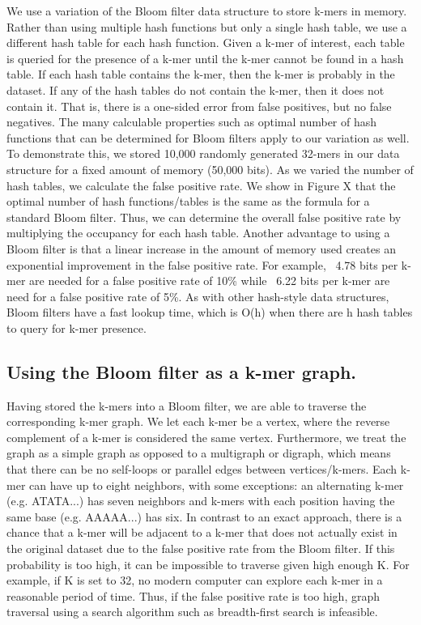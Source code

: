 \documentclass[12pt]{article} \usepackage{simplemargins}
\begin{document}
We use a variation of the Bloom filter data structure to store k-mers
in memory. Rather than using multiple hash functions but only a single
hash table, we use a different hash table for each hash
function. Given a k-mer of interest, each table is queried for the
presence of a k-mer until the k-mer cannot be found in a hash
table. If each hash table contains the k-mer, then the k-mer is
probably in the dataset. If any of the hash tables do not contain the
k-mer, then it does not contain it. That is, there is a one-sided
error from false positives, but no false negatives. The many
calculable properties such as optimal number of hash functions that
can be determined for Bloom filters apply to our variation as well. To
demonstrate this, we stored 10,000 randomly generated 32-mers in our
data structure for a fixed amount of memory (50,000 bits). As we
varied the number of hash tables, we calculate the false positive
rate. We show in Figure X that the optimal number of hash
functions/tables is the same as the formula for a standard Bloom
filter. Thus, we can determine the overall false positive rate by
multiplying the occupancy for each hash table. Another advantage to
using a Bloom filter is that a linear increase in the amount of memory
used creates an exponential improvement in the false positive
rate. For example, ~4.78 bits per k-mer are needed for a false
positive rate of 10\% while ~6.22 bits per k-mer are need for a false
positive rate of
5\%. As with other hash-style data structures, Bloom filters have a
fast lookup time, which is O(h) when there are h hash tables to query
for k-mer presence.

\subsection{Using the Bloom filter as a k-mer graph.}
Having stored the k-mers into a Bloom filter, we are able to traverse
the corresponding k-mer graph. We let each k-mer be a vertex, where
the reverse complement of a k-mer is considered the same
vertex. Furthermore, we treat the graph as a simple graph as opposed
to a multigraph or digraph, which means that there can be no
self-loops or parallel edges between vertices/k-mers. Each k-mer can
have up to eight neighbors, with some exceptions: an alternating k-mer
(e.g. ATATA...) has seven neighbors and k-mers with each position
having the same base (e.g. AAAAA...) has six. In contrast to an exact
approach, there is a chance that a k-mer will be adjacent to a k-mer
that does not actually exist in the original dataset due to the false
positive rate from the Bloom filter. If this probability is too high,
it can be impossible to traverse given high enough K. For example, if
K is set to 32, no modern computer can explore each k-mer in a
reasonable period of time. Thus, if the false positive rate is too
high, graph traversal using a search algorithm such as breadth-first
search is infeasible.
\end{document}
